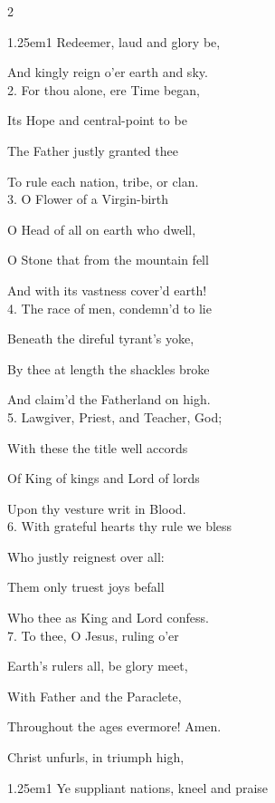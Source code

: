 \begin{paracol}{2}
\begin{hangparas}{1.25em}{1}
Redeemer, laud and glory be,

And kingly reign o’er earth and sky.\\

2. For thou alone, ere Time began,

Its Hope and central-point to be

The Father justly granted thee

To rule each nation, tribe, or clan.\\

3. O Flower of a Virgin-birth

O Head of all on earth who dwell,

O Stone that from the mountain fell

And with its vastness cover'd earth!\\

4. The race of men, condemn'd to lie

Beneath the direful tyrant’s yoke,

By thee at length the shackles broke

And claim'd the Fatherland on high.\\

5. Lawgiver, Priest, and Teacher, God;

With these the title well accords

Of King of kings and Lord of lords

Upon thy vesture writ in Blood.\\

6. With grateful hearts thy rule we bless

Who justly reignest over all:

Them only truest joys befall

Who thee as King and Lord confess.\\

7. To thee, O Jesus, ruling o’er

Earth's rulers all, be glory meet,

With Father and the Paraclete,

Throughout the ages evermore! Amen.
\end{hangparas}

\mattinsOfficeHymn
{} Christ unfurls, in triumph high,


\begin{hangparas}{1.25em}{1}
Ye suppliant nations, kneel and praise


\end{hangparas}
\end{paracol}
